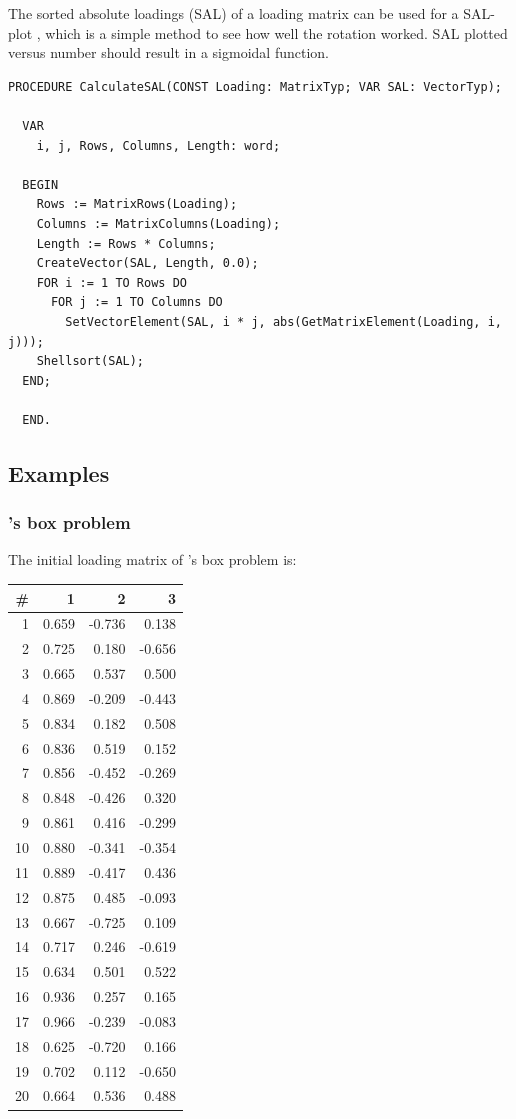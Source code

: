 The sorted absolute loadings (SAL) of a loading matrix can be used for a SAL-plot \parencite{Ber-05}, which is a simple method to see how well the rotation worked. SAL plotted versus number should result in a sigmoidal function.

\begin{lstlisting}[caption=Calculation of SAL]
  PROCEDURE CalculateSAL(CONST Loading: MatrixTyp; VAR SAL: VectorTyp);

  VAR
    i, j, Rows, Columns, Length: word;

  BEGIN
    Rows := MatrixRows(Loading);
    Columns := MatrixColumns(Loading);
    Length := Rows * Columns;
    CreateVector(SAL, Length, 0.0);
    FOR i := 1 TO Rows DO
      FOR j := 1 TO Columns DO
        SetVectorElement(SAL, i * j, abs(GetMatrixElement(Loading, i, j)));
    Shellsort(SAL);
  END;

  END.
\end{lstlisting}

\subsection{Examples}

\subsubsection{'s box problem}

The initial loading matrix  of 's box problem is:

\begin{tabular}{rrrr}
  \toprule
   \# & 1     & 2      &  3     \\
  \midrule
   1 & 0.659 & -0.736 &  0.138 \\
   2 & 0.725 &  0.180 & -0.656 \\
   3 & 0.665 &  0.537 &  0.500 \\
   4 & 0.869 & -0.209 & -0.443 \\
   5 & 0.834 &  0.182 &  0.508 \\
   6 & 0.836 &  0.519 &  0.152 \\
   7 & 0.856 & -0.452 & -0.269 \\
   8 & 0.848 & -0.426 &  0.320 \\
   9 & 0.861 &  0.416 & -0.299 \\
  10 & 0.880 & -0.341 & -0.354 \\
  11 & 0.889 & -0.417 &  0.436 \\
  12 & 0.875 &  0.485 & -0.093 \\
  13 & 0.667 & -0.725 &  0.109 \\
  14 & 0.717 &  0.246 & -0.619 \\
  15 & 0.634 &  0.501 &  0.522 \\
  16 & 0.936 &  0.257 &  0.165 \\
  17 & 0.966 & -0.239 & -0.083 \\
  18 & 0.625 & -0.720 &  0.166 \\
  19 & 0.702 &  0.112 & -0.650 \\
  20 & 0.664 &  0.536 &  0.488 \\
  \bottomrule
\end{tabular}

